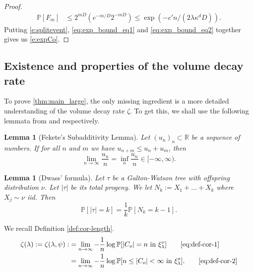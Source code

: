 \documentclass[a4paper,12pt]{scrartcl}
\newcommand{\conn}{\psi}
\renewcommand{\P}{\mathbb{P}}
\newcommand{\reals}{\mathbb{R}}
\newtheorem{lemma}[theorem]{Lemma}
\theoremstyle{definition}
\theoremstyle{remark}
\begin{document}
\begin{proof}
\begin{equation}
\begin{aligned}
        \P[F_m]
        & \leq
        2^{mD}
        (
          e^{-m/D}
          2^{-mD}
        )
        \leq
        \exp(-c'n/(2 \lambda \kappa^d D)).
      \end{aligned}
    \end{equation}
    Putting \eqref{e:splitevent}, \eqref{eq:exp_bound_eq1} and \eqref{eq:exp_bound_eq2} together gives us \eqref{e:expCo}.
  \end{proof}

  \subsection{Existence and properties of the volume decay rate}\label{sec:LogDecay}
  To prove
  \autoref{thm:main_large}, the only missing ingredient is a more detailed understanding of the volume decay rate $\zeta$. To get this,
  we shall use the following lemmata
  from
  \cite{feketeWurz} and
  \cite{dwass} respectively.
  \begin{lemma}[Fekete's Subadditivity Lemma] \label{lem:Fekete}
    Let $(u_n)_n\subset \reals$ be a sequence of numbers. If for all $n$ and $m$ we have $u_{n+m}\leq u_n + u_m$, then
    $$
    \lim_{n\to\infty} \frac{u_n}{n}
    =
    \inf_n \frac{u_n}{n}
    \in
    [-\infty, \infty).
    $$
  \end{lemma}
  \begin{lemma}[Dwass' formula]\label{thm:dwass}
    Let $\tau$ be a Galton-Watson tree with offspring distribution $\nu$. Let $|\tau|$ be its total progeny. We let $N_k := X_1+\dots+X_k$ where $X_j\sim \nu$ iid.  Then
    \begin{equation}
      \P[|\tau| = k]=\frac1k \P[N_k=k-1].
    \end{equation}
  \end{lemma}

  We recall Definition \ref{def:cor-length}.
  \begin{align}
    \zeta(\lambda):=
    \zeta(\lambda, \conn)
    : & =
    \lim_{n\to\infty}
    -\frac1n \log \P[|C_o|= n\text{ in }\xi_{\lambda}^o]\tag*{\eqref{eq:def-cor-1}}
    \\
    & =
    \lim_{n\to\infty}
    -\frac1n \log \P[
      n\leq|C_o|< \infty \text{ in }\xi_{\lambda}^o
    ].\tag*{\eqref{eq:def-cor-2}}
  \end{align}
\end{document}
